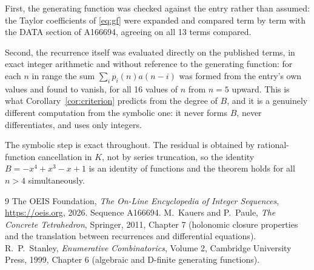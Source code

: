 \documentclass[11pt,a4paper]{article}
\theoremstyle{plain}
\theoremstyle{definition}
\begin{document}
First, the generating function was checked against the entry rather than assumed: the
Taylor coefficients of \eqref{eq:gf} were expanded and compared term by term with the DATA
section of A166694, agreeing on all 13 terms compared.

Second, the recurrence itself was evaluated directly on the published terms, in exact
integer arithmetic and without reference to the generating function: for each $n$ in range
the sum $\sum_{i}p_{i}(n)a(n-i)$ was formed from the entry's own values and found to
vanish, for all 16 values of $n$ from $n=5$ upward. This is what
Corollary~\ref{cor:criterion} predicts from the degree of $B$, and it is a genuinely
different computation from the symbolic one: it never forms $B$, never differentiates, and
uses only integers.

The symbolic step is exact throughout. The residual is obtained by rational-function
cancellation in $K$, not by series truncation, so the identity $B=- x^{4} + x^{3} - x + 1$ is an
identity of functions and the theorem holds for all $n>4$ simultaneously.

\begin{thebibliography}{9}
 The OEIS Foundation, \emph{The On-Line Encyclopedia of Integer Sequences},
\url{https://oeis.org}, 2026. Sequence A166694.
 M.~Kauers and P.~Paule, \emph{The Concrete Tetrahedron}, Springer, 2011,
Chapter 7 (holonomic closure properties and the translation between recurrences and
differential equations).
 R.~P.~Stanley, \emph{Enumerative Combinatorics}, Volume 2, Cambridge
University Press, 1999, Chapter 6 (algebraic and D-finite generating functions).
\end{thebibliography}
\end{document}
